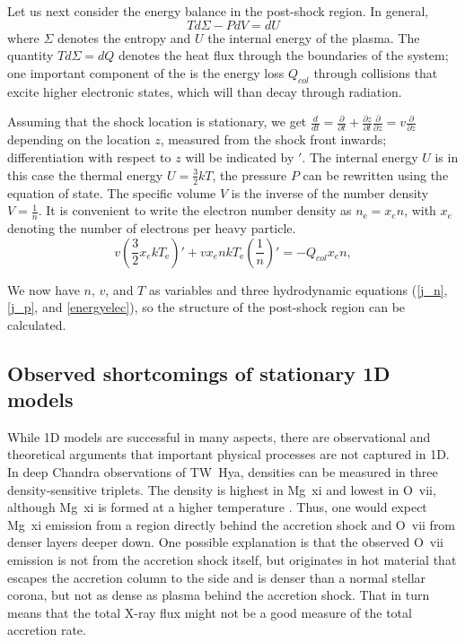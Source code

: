 Let us next consider the energy balance in the post-shock region. In general,
\begin{equation} \label{tsminuspdvisdu} T d\Sigma -P dV=dU \end{equation}
where $\Sigma$ denotes the entropy and $U$ the internal energy of the plasma. The quantity $T d\Sigma=dQ$ denotes the heat flux through the boundaries of the system; one important component of the is the energy loss $Q_{col}$ through collisions that excite higher electronic states, which will than decay through radiation.

Assuming that the shock location is stationary, we get $\frac{d}{dt}=\frac{\partial}{\partial t}+\frac{\partial z}{\partial t}\frac{\partial}{\partial z}=v\frac{\partial}{\partial z}$ depending on the location $z$, measured from the shock front inwards; differentiation with respect to $z$ will be indicated by $'$.
The internal energy $U$ is in this case the thermal energy $U=\frac{3}{2}kT$, the pressure $P$ can be rewritten using the equation of state. The specific volume $V$ is the inverse of the number density $V=\frac{1}{n}$.
It is convenient to write the electron number density as \mbox{$n_{\mathrm{e}}=x_e n$,} with $x_e$ denoting the number of electrons per heavy particle.
\begin{equation}
\label{energyelec}
v\left(\frac{3}{2}x_e k T_{\mathrm{e}}\right)'+v x_e n k T_{\mathrm{e}} \left(\frac{1}{n}\right)'=-Q_{col} x_e n,
\end{equation}

We now have $n$, $v$, and $T$ as variables and three hydrodynamic equations (\ref{j_n}, \ref{j_p}, and \ref{energyelec}), so the structure of the post-shock region can be calculated.


\subsection{Observed shortcomings of stationary 1D models}
While 1D models are successful in many aspects, there are observational and theoretical arguments that important physical processes are not captured in 1D. In deep Chandra observations of TW~Hya, densities can be measured in three density-sensitive triplets. The density is highest in Mg~{\sc xi} and lowest in O~{\sc vii}, although Mg~{\sc xi} is formed at a higher temperature \cite{Brickhouse_2010}. Thus, one would expect Mg~{\sc xi} emission from a region directly behind the accretion shock and O~{\sc vii} from denser layers deeper down. One possible explanation is that the observed O~{\sc vii} emission is not from the accretion shock itself, but originates in hot material that escapes the accretion column to the side and is denser than a normal stellar corona, but not as dense as plasma behind the accretion shock. That in turn means that the total X-ray flux might not be a good measure of the total accretion rate.

